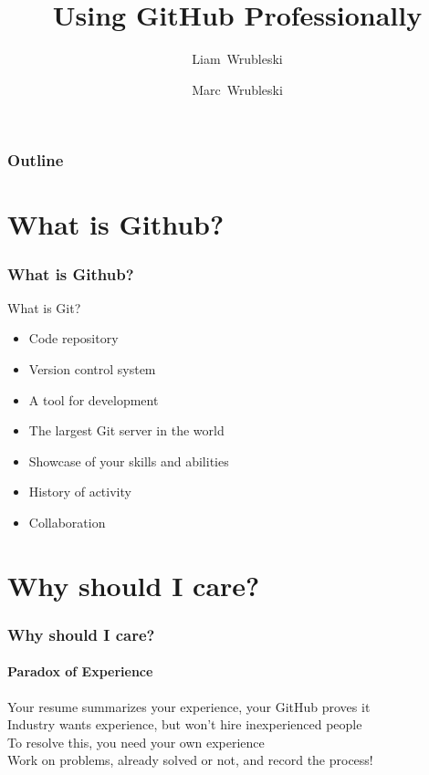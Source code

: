 \documentclass{beamer}
\title[]{Using GitHub Professionally}
\author[]{Liam~Wrubleski\inst{1} \and Marc~Wrubleski\inst{2}}
\institute{
\inst{1}%
BSc. Electrical Engineering, BSc. Mathematics
\and
\inst{2}%
Technical Manager at the Schulich School of Engineering %
}
\begin{document}
\begin{frame}[plain]
  \maketitle
\end{frame}

\begin{frame}
  \frametitle{Outline}
  \tableofcontents
\end{frame}

\section{What is Github?}
\begin{frame}
  \frametitle{What is Github?}
  What is Git?\pause
  \begin{itemize}[<+->]
    \item Code repository
    \item Version control system
    \item A tool for development
  \end{itemize}
  \vspace{0.25em}
  \begin{itemize}[<+->]
    \item The largest Git server in the world
    \item Showcase of your skills and abilities
    \item History of activity
    \item Collaboration %
  \end{itemize}
\end{frame}

\section{Why should I care?}
\begin{frame}
  \frametitle{Why should I care?}
  \framesubtitle{Paradox of Experience}
  Your resume summarizes your experience, your GitHub proves it\\\pause\vspace{0.25em}
  Industry wants experience, but won't hire inexperienced people\\\pause\vspace{0.25em}
  To resolve this, you need your own experience\\\pause\vspace{0.25em}
  Work on problems, already solved or not, and record the process!
\end{frame}
\end{document}
